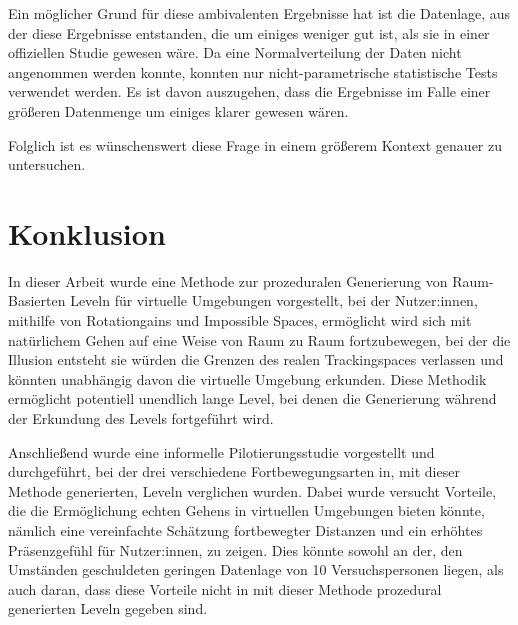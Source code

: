             Ein möglicher Grund für diese ambivalenten Ergebnisse hat ist die Datenlage, aus der diese Ergebnisse entstanden, die um einiges weniger gut ist, als sie in einer offiziellen Studie gewesen wäre. Da eine Normalverteilung der Daten nicht angenommen werden konnte, konnten nur nicht-parametrische statistische Tests verwendet werden.
            Es ist davon auszugehen, dass die Ergebnisse im Falle einer größeren Datenmenge um einiges klarer gewesen wären.

            Folglich ist es wünschenswert diese Frage in einem größerem Kontext genauer zu untersuchen.

    \section{Konklusion}
        In dieser Arbeit wurde eine Methode zur prozeduralen Generierung von Raum-Basierten Leveln für virtuelle Umgebungen vorgestellt, bei der  Nutzer:innen, mithilfe von Rotationgains und Impossible Spaces, ermöglicht wird sich mit natürlichem Gehen auf eine Weise von Raum zu Raum fortzubewegen, bei der die Illusion entsteht sie würden die Grenzen des realen Trackingspaces verlassen und könnten unabhängig davon die virtuelle Umgebung erkunden. Diese Methodik ermöglicht potentiell unendlich lange Level, bei denen die Generierung während der Erkundung des Levels fortgeführt wird.

        Anschließend wurde eine informelle Pilotierungsstudie vorgestellt und durchgeführt, bei der drei verschiedene Fortbewegungsarten in, mit dieser Methode generierten, Leveln verglichen wurden. Dabei wurde versucht Vorteile, die die Ermöglichung echten Gehens in virtuellen Umgebungen bieten könnte, nämlich eine vereinfachte Schätzung fortbewegter Distanzen und ein erhöhtes Präsenzgefühl für Nutzer:innen, zu zeigen. Dies könnte sowohl an der, den Umständen geschuldeten geringen Datenlage von 10 Versuchspersonen liegen, als auch daran, dass diese Vorteile nicht in mit dieser Methode prozedural generierten Leveln gegeben sind.



